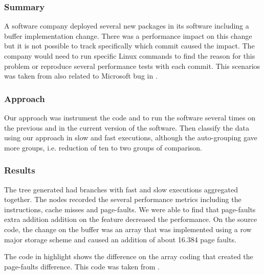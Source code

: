 \subsubsection{Summary}
    A software company deployed several new packages in its software including a buffer implementation change. There was a performance impact on this change but it is not possible to track specifically which commit caused the impact. The company would need to run specific Linux commands to find the reason for this problem or reproduce several performance tests with each commit. This scenarios was taken from \cite{essentials} also related to Microsoft bug in \cite{microsoft_bug}.
    
\subsubsection{Approach}
    Our approach was instrument the code and to run the software several times on the previous and in the current version of the software. Then classify the data using our approach in slow and fast executions, although the auto-grouping gave more groups, i.e. reduction of ten to two groups of comparison.
  
\subsubsection{Results}
      The tree generated had branches with fast and slow executions aggregated together. The nodes recorded the several performance metrics including the instructions, cache misses and page-faults.
      We were able to find that page-faults extra addition addition on the feature decreased the performance.
      On the source code, the change on the buffer was an array that was implemented using a row major storage scheme and caused an addition of about 16.384 page faults.
      
      

    The code in highlight shows the difference on the array coding that created the page-faults difference. This code was taken from \cite{essentials}.
    
    

